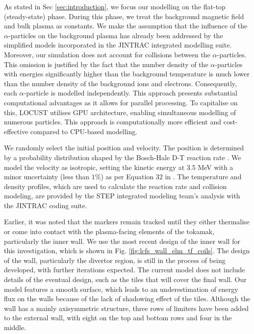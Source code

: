 \documentclass[10pt, a4paper, twoside]{article}
\begin{document}
As stated in Sec \ref{sec:introduction}, we focus our modelling on the flat-top (steady-state) phase. During this phase, we treat the background magnetic field and bulk plasma as constants. We make the assumption that the influence of the $\alpha$-particles on the background plasma has already been addressed by the simplified models incorporated in the JINTRAC integrated modelling suite.
Moreover, our simulation does not account for collisions between the $\alpha$-particles. This omission is justified by the fact that the number density of the $\alpha$-particles with energies significantly higher than the background temperature is much lower than the number density of the background ions and electrons. Consequently, each $\alpha$-particle is modelled independently. This approach presents substantial computational advantages as it allows for parallel  processing.
To capitalise on this, LOCUST utilises GPU architecture, enabling simultaneous modelling of numerous particles. This approach is computationally more efficient and cost-effective compared to CPU-based modelling.

We randomly select the initial position and velocity. The position is determined by a probability distribution shaped by the Bosch-Hale D-T reaction rate \cite{bosch1992}. We model the velocity as isotropic, setting the kinetic energy at 3.5 MeV with a minor uncertainty (less than $1\%$) as per Equation 32 in \cite{brysk1973}. The temperature and density profiles, which are used to calculate the reaction rate and collision modeling, are provided by the STEP integrated modeling team's analysis with the JINTRAC coding suite.

Earlier, it was noted that the markers remain tracked until they either thermalise or come into contact with the plasma-facing elements of the tokamak, particularly the inner wall. We use the most recent design of the inner wall for this investigation, which is shown in Fig. \ref{fig:lcfs_wall_elm_tf_coils}. The design of the wall, particularly the divertor region, is still in the process of being developed, with further iterations expected. The current model does not include details of the eventual design, such as the tiles that will cover the final wall. Our model features a smooth surface, which leads to an underestimation of energy flux on the walls because of the lack of shadowing effect of the tiles. Although the wall has a mainly axisymmetric structure, three rows of limiters have been added to the external wall, with eight on the top and bottom rows and four in the middle.
\end{document}
